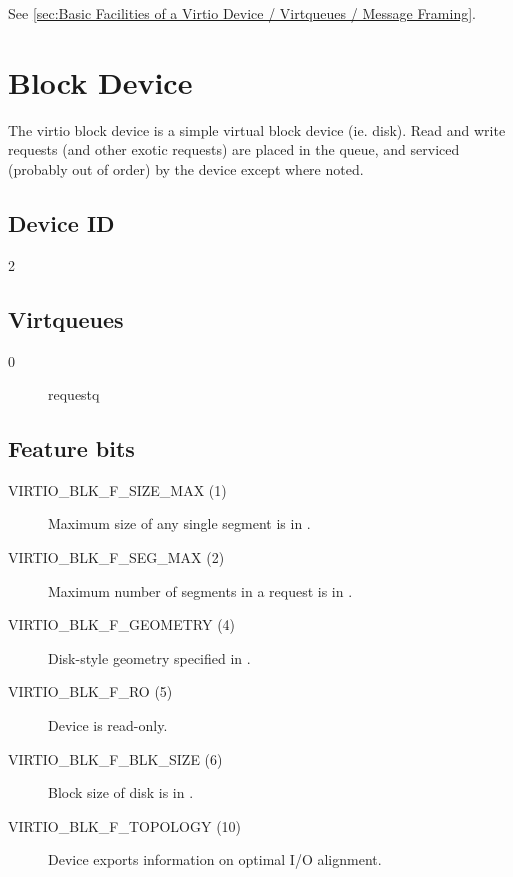 See \ref{sec:Basic
Facilities of a Virtio Device / Virtqueues / Message Framing}.

\section{Block Device}\label{sec:Device Types / Block Device}

The virtio block device is a simple virtual block device (ie.
disk). Read and write requests (and other exotic requests) are
placed in the queue, and serviced (probably out of order) by the
device except where noted.

\subsection{Device ID}\label{sec:Device Types / Block Device / Device ID}
  2

\subsection{Virtqueues}\label{sec:Device Types / Block Device / Virtqueues}
\begin{description}
\item[0] requestq
\end{description}

\subsection{Feature bits}\label{sec:Device Types / Block Device / Feature bits}

\begin{description}
\item[VIRTIO_BLK_F_SIZE_MAX (1)] Maximum size of any single segment is
    in .

\item[VIRTIO_BLK_F_SEG_MAX (2)] Maximum number of segments in a
    request is in .

\item[VIRTIO_BLK_F_GEOMETRY (4)] Disk-style geometry specified in
    .

\item[VIRTIO_BLK_F_RO (5)] Device is read-only.

\item[VIRTIO_BLK_F_BLK_SIZE (6)] Block size of disk is in .

\item[VIRTIO_BLK_F_TOPOLOGY (10)] Device exports information on optimal I/O
    alignment.
\end{description}

